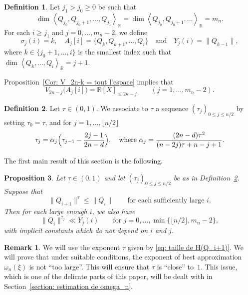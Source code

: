 \documentclass[JEP,XML,SOM,Unicode,NoFloatCountersInSection,published]{cedram}
\newcommand\bR{\mathbb{R}}
\newcommand{\normH}[1]{\|#1\|}
\newcommand{\Vect}[2][]{\left\la #2\right\ra_{#1}}
\let\la\langle
\let\ra\rangle
\newcommand\AND{\quad\text{and}\quad}
\theoremstyle{definition}
\newtheorem{Def}{Definition}[section]
\newtheorem*{remark*}{Remark}
\theoremstyle{plain}
\newtheorem{Prop}[Def]{Proposition}
\begin{document}
\begin{Def}
\label{Def: j_0,j_1,sigma_j(i) et Aj[i]}
Let $j_1 > j_0\geq 0$ be such that
\[
\dim \Vect[\bR]{Q_{j_0},Q_{j_0+1},\dots, Q_{j_1}} = \dim \Vect[\bR]{Q_{j_0},Q_{j_0+1},\dots} = m_n.
\]
For each $i\geq j_1$ and $j=0,\dots, m_n -2$, we define
\[
\sigma_j(i) = k, \quad A_j[i] = \{Q_k, Q_{k+1},\dots, Q_i \} \AND Y_j(i) = \normH{Q_{k-1}},
\]
where $k\in\{j_0+1,\dots,i\}$ is the smallest index such that $\dim \Vect[\bR]{Q_k,\dots, Q_i} = j+1$.
\end{Def}

Proposition~\ref{Cor: V_2n-k = tout l'espace} implies that
\begin{equation}
\label{eq: V_2n-j(A_j[i]) = tout l'espace}
V_{2n-j}\big(A_j[i]\big) = \bR[X]_{\leq 2n-j} \qquad (j=1,\dots,m_n-2).
\end{equation}

\begin{Def}
\label{Def: tau_j}
Let $\tau\in(0,1)$. We associate to $\tau$ a sequence $(\tau_j)_{0\leq j\leq n/2}$ by setting $\tau_0 = \tau$, and for $j=1,\dots,\lfloor n/2 \rfloor$
\begin{equation*}
\tau_{j} = \alpha_j\Bigl(\tau_{j-1} - \frac{2j-1}{2n-d} \Bigr), \quad \textrm{where } \alpha_j = \frac{(2n-d)\tau^2}{(n-2j)\tau+n-j+1}.
\end{equation*}
\end{Def}

The first main result of this section is the following.

\begin{Prop}
\label{Prop: prop resumee avec tau_j}
Let $\tau\in(0,1)$ and let $(\tau_j)_{0\leq j \leq n/2}$ be as in Definition~\ref{Def: tau_j}. Suppose that
\begin{equation}
\label{eq: def exposant tau}
\normH{Q_{i+1}}^\tau \leq \normH{Q_i} \qquad \textrm{for each sufficiently large $i$}.
\end{equation}
Then for each large enough $i$, we also have
\begin{equation}
\label{eq Prop: minoration de Y_j}
\normH{Q_i}^{\tau_j} \ll Y_j(i) \qquad \textrm{for } j=0,\dots, \min\big\{\lfloor n/2\rfloor,m_n-2\big\},
\end{equation}
with implicit constants which do not depend on $i$ and $j$.
\end{Prop}

\begin{remark*}
We will use the exponent $\tau$ given by \eqref{eq: taille de H(Q_i+1)}. We will prove that under suitable conditions, the exponent of best approximation $\omega_n(\xi)$ is not ``too large''. This will ensure that $\tau$ is ``close'' to~$1$. This issue, which is one of the delicate parts of this paper, will be dealt with in Section~\ref{section: estimation de omega_n}.
\end{remark*}
\end{document}
